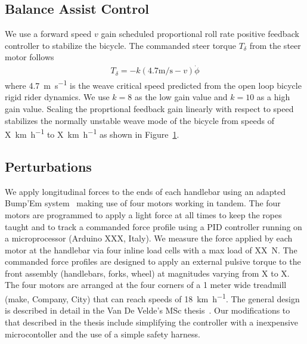 \documentclass{article}
\begin{document}
\subsection{Balance Assist Control}
We use a forward speed \(v\) gain scheduled proportional roll rate positive
feedback controller to stabilize the bicycle. The commanded steer torque
\(T_\delta\) from the steer motor follows
\begin{align}
  T_\delta = -k(4.7\si{\meter\per\second} - v)\dot{\phi}
\end{align}
where 4.7~\si{\meter\per\second} is the weave critical speed predicted from the
open loop bicycle rigid rider dynamics. We use \(k=8\) as the low gain value
and \(k=10\) as a high gain value. Scaling the proprtional feedback gain
linearly with respect to speed stabilizes the normally unstable weave mode of
the bicycle from speeds of X~\si{\kilo\meter\per\hour} to
X~\si{\kilo\meter\per\hour} as shown in Figure~\ref{fig:eigenvalues}.


\begin{figure}
  \label{fig:eigenvalues}
\end{figure}

\subsection{Perturbations}
%
We apply longitudinal forces to the ends of each handlebar using an adapted
Bump'Em system~\cite{Tan2020} making use of four motors working in tandem. The
four motors are programmed to apply a light force at all times to keep the
ropes taught and to track a commanded force profile using a PID controller
running on a microprocessor (Arduino XXX, Italy). We measure the force applied
by each motor at the handlebar via four inline load cells with a max load of
XX~\si{\newton}. The commanded force profiles are designed to apply an external
pulsive torque to the front assembly (handlebars, forks, wheel) at magnitudes
varying from X to X. The four motors are arranged at the four corners of a 1
meter wide treadmill (make, Company, City) that can reach speeds of
18~\si{\kilo\meter\per\hour}. The general design is described in detail in the
Van De Velde's MSc thesis~\cite{vandeVelde2022}. Our modifications to that
described in the thesis include simplifying the controller with a inexpensive
microcontoller and the use of a simple safety harness.
\end{document}
